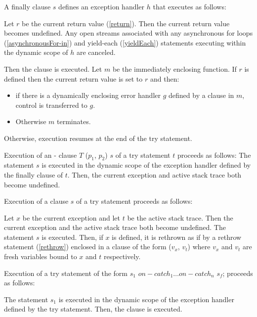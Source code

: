 \documentclass{article}
\newcommand{\code}[1]{{\sf #1}}
\begin{document}
\LMHash{}
A finally clause \FINALLY{} $s$ defines an exception handler $h$ that executes as follows:

\LMHash{}
Let $r$ be the current return value (\ref{return}). Then the current return value becomes undefined. Any open streams associated with any asynchronous for loops (\ref{asynchronousFor-in}) and yield-each (\ref{yieldEach}) statements executing within the dynamic scope of $h$ are canceled. 


\LMHash{}
Then the \FINALLY{} clause is executed. Let $m$ be the immediately enclosing function. If $r$ is defined then the current return value is set to $r$ and then:
\begin{itemize}
\item
 if there is a dynamically enclosing error handler $g$ defined by a \FINALLY{} clause in $m$, control is transferred to $g$.
 \item
Otherwise $m$ terminates. 
\end{itemize}

Otherwise, execution resumes at the end of the try statement.

\LMHash{}
Execution of an \ON{}-\CATCH{} clause \code{\ON{} $T$ \CATCH{} ($p_1$, $p_2$)} $s$ of a try statement $t$ proceeds as follows: The statement $s$ is executed in the dynamic scope of the exception handler defined by the finally clause of $t$. Then, the current exception and active stack trace both become undefined.

\LMHash{}
Execution of a \FINALLY{} clause \FINALLY{} $s$ of a try statement proceeds as follows: 

\LMHash{}
Let $x$ be the current exception and let $t$ be the active stack trace. Then the current exception and the active stack trace both become undefined. The statement $s$ is executed. Then, if $x$ is defined,  it is rethrown as if by a rethrow statement (\ref{rethrow}) enclosed in a \CATCH{} clause of the form \code{\CATCH{} ($v_x$, $v_t$)} where $v_x$ and $v_t$ are fresh variables bound to $x$ and $t$ respectively.


\LMHash{}
Execution of a try statement of the form \code{\TRY{} $s_1$ $on-catch_1 \ldots on-catch_n$ \FINALLY{} $s_f$;}  proceeds as follows:

\LMHash{}
The statement $s_1$ is executed in the dynamic scope of the exception handler defined by the try statement. Then, the \FINALLY{} clause is executed.
\end{document}
